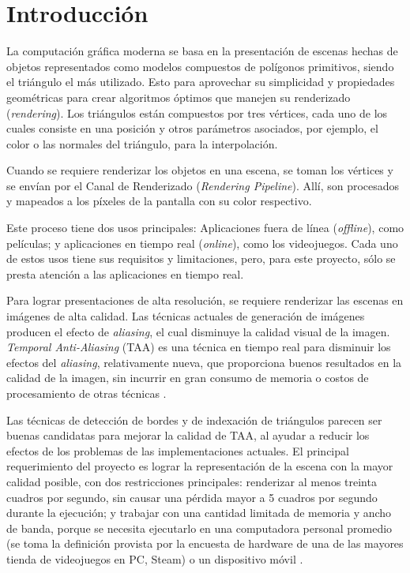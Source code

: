 \documentclass[pregrado]{tesis-usb} %
\begin{document}
\mainmatter

\chapter[Introducción]{Introducción}
La computación gráfica moderna se basa en la presentación de escenas hechas de objetos representados como modelos compuestos de polígonos primitivos, siendo el triángulo el más utilizado. Esto para aprovechar su simplicidad y propiedades geométricas para crear algoritmos óptimos que manejen su renderizado (\textit{rendering}). Los triángulos están compuestos por tres vértices, cada uno de los cuales consiste en una posición y otros parámetros asociados, por ejemplo, el color o las normales del triángulo, para la interpolación.

Cuando se requiere renderizar los objetos en una escena, se toman los vértices y se envían por el Canal de Renderizado (\textit{Rendering Pipeline}). Allí, son procesados y mapeados a los píxeles de la pantalla con su color respectivo.

Este proceso tiene dos usos principales: Aplicaciones fuera de línea (\textit{offline}), como películas; y aplicaciones en tiempo real (\textit{online}), como los videojuegos. Cada uno de estos usos tiene sus requisitos y limitaciones, pero, para este proyecto, sólo se presta atención a las aplicaciones en tiempo real.

Para lograr presentaciones de alta resolución, se requiere renderizar las escenas en imágenes de alta calidad. Las técnicas actuales de generación de imágenes producen el efecto de \textit{aliasing}, el cual disminuye la calidad visual de la imagen. \textit{Temporal Anti-Aliasing} (TAA) es una técnica en tiempo real para disminuir los efectos del \textit{aliasing}, relativamente nueva, que proporciona buenos resultados en la calidad de la imagen, sin incurrir en gran consumo de memoria o costos de procesamiento de otras técnicas \cite{Doggett2017EDAN35}. 

Las técnicas de detección de bordes y de indexación de triángulos parecen ser buenas candidatas para mejorar la calidad de TAA, al ayudar a reducir los efectos de los problemas de las implementaciones actuales. El principal requerimiento del proyecto es lograr la representación de la escena con la mayor calidad posible, con dos restricciones principales: renderizar al menos treinta cuadros por segundo, sin causar una pérdida mayor a 5 cuadros por segundo durante la ejecución; y trabajar con una cantidad limitada de memoria y ancho de banda, porque se necesita ejecutarlo en una computadora personal promedio (se toma la definición provista por la encuesta de hardware de una de las mayores tienda de videojuegos en PC, Steam) \cite{valvecorporation2018} o un dispositivo móvil \cite{Doggett2017EDAN35, Shreiner2011}. 
\end{document}
